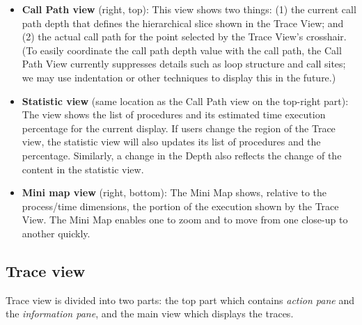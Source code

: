 \documentclass[english]{article}
\begin{document}
\begin{itemize}
\item \textbf{Call Path view} (right, top):
  This view shows two things: (1) the current call path depth that defines the hierarchical slice shown in the Trace View; and (2) the actual call path for the point selected by the Trace View's crosshair.
  (To easily coordinate the call path depth value with the call path, the Call Path View currently suppresses details such as loop structure and call sites; we may use indentation or other techniques to display this in the future.)

\item \textbf{Statistic view} (same location as the Call Path view on the top-right part):
  The view shows the list of procedures and its estimated time execution percentage for the current display. If users change the region of the Trace view, the statistic view will also updates its list of procedures and the percentage. Similarly, a change in the Depth also reflects the change of the content in the statistic view.

\item \textbf{Mini map view} (right, bottom):
  The Mini Map shows, relative to the process/time dimensions, the portion of the execution shown by the Trace View.
  The Mini Map enables one to zoom and to move from one close-up to another quickly.

\end{itemize}



\subsection{Trace view}

Trace view is divided into two parts: the top part which contains \emph{action pane} and the \emph{information pane}, and the main view which displays the traces. 
\end{document}
